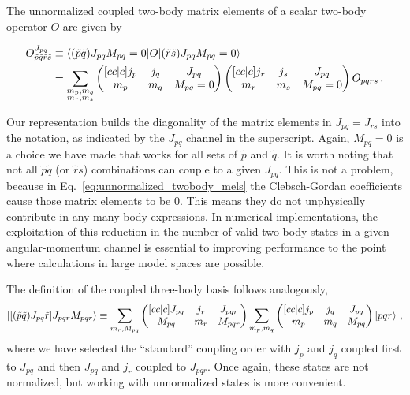 The unnormalized coupled two-body matrix elements of
a scalar two-body operator $O$ are given by
\begin{samepage}
  \begin{align}
    O^{J_{pq}}_{\tilde{p}\tilde{q}\tilde{r}\tilde{s}}
     & \equiv \braket{
      (\tilde{p} \tilde{q})J_{pq} M_{pq}=0|
      O
      |(\tilde{r} \tilde{s})J_{pq} M_{pq}=0
    }                           \\
     & =\sum_{\substack{m_p,m_q \\ m_r,m_s}}
    \begin{pmatrix}[cc|c] j_p & j_q & J_{pq} \\ m_p & m_q & M_{pq} = 0 \end{pmatrix}
    \begin{pmatrix}[cc|c] j_r & j_s & J_{pq} \\ m_r & m_s & M_{pq} = 0 \end{pmatrix}
    O_{pqrs}\,.\label{eq:unnormalized_twobody_mels}
  \end{align}
\end{samepage}
Our representation builds the diagonality of the matrix elements
in $J_{pq} = J_{rs}$ into the notation,
as indicated by the $J_{pq}$ channel in the superscript.
Again, $M_{pq} = 0$ is a choice we have made that works
for all sets of $\tilde{p}$ and $\tilde{q}$.
It is worth noting that not all $\tilde{p} \tilde{q}$
(or $\tilde{r} \tilde{s}$) combinations
can couple to a given $J_{pq}$.
This is not a problem, because in Eq.~\eqref{eq:unnormalized_twobody_mels}
the Clebsch-Gordan coefficients cause those matrix elements to be 0.
This means they do not unphysically contribute in any many-body expressions.
In numerical implementations,
the exploitation of this reduction in the number of valid two-body states
in a given angular-momentum channel
is essential to improving performance to the point
where calculations in large model spaces are possible.

The definition of the coupled three-body basis follows analogously,
\begin{equation}\label{eq:unnormalized_threebody_basis}
  \ket{[(\tilde{p} \tilde{q}) J_{pq} \tilde{r}] J_{pqr} M_{pqr}} \equiv
  \sum_{m_r, M_{pq}}
  \begin{pmatrix}[cc|c] J_{pq} & j_r & J_{pqr} \\ M_{pq} & m_r & M_{pqr} \end{pmatrix}
  \sum_{m_p, m_q}
  \begin{pmatrix}[cc|c] j_p & j_q & J_{pq} \\ m_p & m_q & M_{pq} \end{pmatrix}
  \ket{pqr}
  \,,
\end{equation}
where we have selected the ``standard'' coupling order
with $j_p$ and $j_q$ coupled first to $J_{pq}$
and then $J_{pq}$ and $j_r$ coupled to $J_{pqr}$.
Once again, these states are not normalized,
but working with unnormalized states is more convenient.


